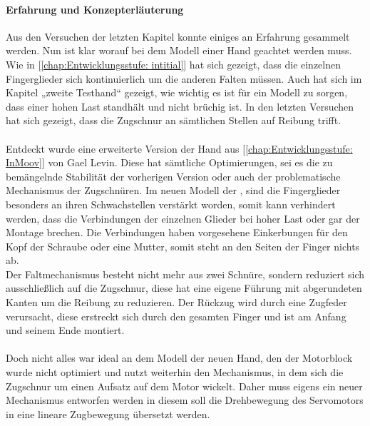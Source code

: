 \documentclass[titlepage,12pt,twoside]{article}
\begin{document}
\paragraph{Erfahrung und Konzepterläuterung}
\hfill \break
\hfill \break
Aus den Versuchen der letzten Kapitel konnte einiges an Erfahrung gesammelt werden. Nun ist klar worauf bei dem Modell einer Hand geachtet werden muss. \\
Wie in [\textcolor{blue}{\autoref{chap:Entwicklungsstufe: intitial}}] hat sich gezeigt, dass die einzelnen Fingerglieder sich kontinuierlich um die anderen Falten müssen. Auch hat sich im Kapitel „zweite Testhand“ gezeigt, wie wichtig es ist für ein Modell zu sorgen, dass einer hohen 
Last standhält und nicht brüchig ist. In den letzten Versuchen hat sich gezeigt, dass die Zugschnur an sämtlichen Stellen auf Reibung trifft. \\
\\
Entdeckt wurde eine erweiterte Version der Hand aus [\textcolor{blue}{\autoref{chap:Entwicklungsstufe: InMoov}}] von Gael Levin. Diese hat sämtliche Optimierungen, sei es die zu bemängelnde Stabilität der vorherigen Version oder auch der problematische Mechanismus der 
Zugschnüren. Im neuen Modell der , sind die Fingerglieder besonders an ihren Schwachstellen verstärkt worden, somit kann verhindert werden, dass die Verbindungen der einzelnen Glieder bei hoher Last oder gar der Montage brechen. Die 
Verbindungen haben vorgesehene Einkerbungen für den Kopf der Schraube oder eine Mutter, somit steht an den Seiten der Finger nichts ab. \\
Der Faltmechanismus besteht nicht mehr aus zwei Schnüre, sondern reduziert sich ausschließlich auf die Zugschnur, diese hat eine eigene Führung mit abgerundeten Kanten um die Reibung zu reduzieren. Der Rückzug wird durch eine Zugfeder verursacht, 
diese erstreckt sich durch den gesamten Finger und ist am Anfang und seinem Ende montiert. \\
\\
Doch nicht alles war ideal an dem Modell der neuen Hand, den der Motorblock wurde nicht optimiert und nutzt weiterhin den Mechanismus, in dem sich die Zugschnur um einen Aufsatz auf dem Motor wickelt. Daher muss eigens ein neuer Mechanismus 
entworfen werden in diesem soll die Drehbewegung des Servomotors in eine lineare Zugbewegung übersetzt werden. \\
\\
\end{document}
